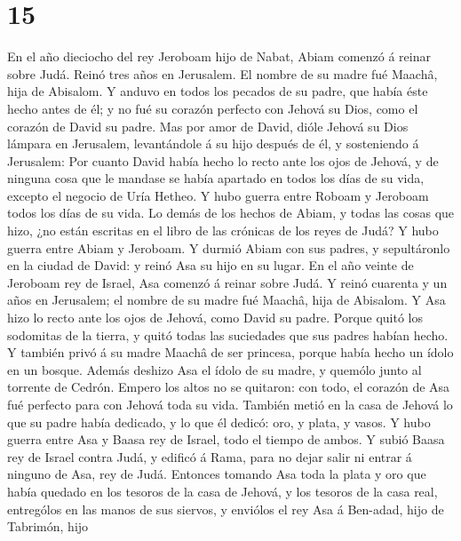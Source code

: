 \hypertarget{section-14}{%
\section{15}\label{section-14}}

 En el año dieciocho del rey Jeroboam hijo de Nabat, Abiam
comenzó á reinar sobre Judá.  Reinó tres años en
Jerusalem. El nombre de su madre fué Maachâ, hija de Abisalom.
 Y anduvo en todos los pecados de su padre, que había éste
hecho antes de él; y no fué su corazón perfecto con Jehová su Dios, como
el corazón de David su padre.  Mas por amor de David,
dióle Jehová su Dios lámpara en Jerusalem, levantándole á su hijo
después de él, y sosteniendo á Jerusalem:  Por cuanto
David había hecho lo recto ante los ojos de Jehová, y de ninguna cosa
que le mandase se había apartado en todos los días de su vida, excepto
el negocio de Uría Hetheo.  Y hubo guerra entre Roboam y
Jeroboam todos los días de su vida.  Lo demás de los
hechos de Abiam, y todas las cosas que hizo, ¿no están escritas en el
libro de las crónicas de los reyes de Judá? Y hubo guerra entre Abiam y
Jeroboam.  Y durmió Abiam con sus padres, y sepultáronlo
en la ciudad de David: y reinó Asa su hijo en su lugar. 
En el año veinte de Jeroboam rey de Israel, Asa comenzó á reinar sobre
Judá.  Y reinó cuarenta y un años en Jerusalem; el nombre
de su madre fué Maachâ, hija de Abisalom.  Y Asa hizo lo
recto ante los ojos de Jehová, como David su padre. 
Porque quitó los sodomitas de la tierra, y quitó todas las suciedades
que sus padres habían hecho.  Y también privó á su madre
Maachâ de ser princesa, porque había hecho un ídolo en un bosque. Además
deshizo Asa el ídolo de su madre, y quemólo junto al torrente de Cedrón.
 Empero los altos no se quitaron: con todo, el corazón de
Asa fué perfecto para con Jehová toda su vida.  También
metió en la casa de Jehová lo que su padre había dedicado, y lo que él
dedicó: oro, y plata, y vasos.  Y hubo guerra entre Asa y
Baasa rey de Israel, todo el tiempo de ambos.  Y subió
Baasa rey de Israel contra Judá, y edificó á Rama, para no dejar salir
ni entrar á ninguno de Asa, rey de Judá.  Entonces
tomando Asa toda la plata y oro que había quedado en los tesoros de la
casa de Jehová, y los tesoros de la casa real, entrególos en las manos
de sus siervos, y enviólos el rey Asa á Ben-adad, hijo de Tabrimón, hijo
